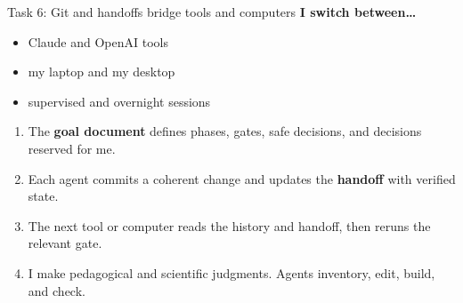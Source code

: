 \begin{frame}{Task 6: Git and handoffs bridge tools and computers}
  \vfill
  \textbf{I switch between\ldots}
  \begin{itemize}\setlength\itemsep{0.35em}
    \item Claude and OpenAI tools
    \item my laptop and my desktop
    \item supervised and overnight sessions
  \end{itemize}
  \vspace{0.9em}
  \begin{enumerate}\setlength\itemsep{0.38em}
    \item The \textbf{goal document} defines phases, gates, safe decisions, and decisions reserved for me.
    \item Each agent commits a coherent change and updates the \textbf{handoff} with verified state.
    \item The next tool or computer reads the history and handoff, then reruns the relevant gate.
    \item I make pedagogical and scientific judgments. Agents inventory, edit, build, and check.
  \end{enumerate}
  \vfill
  \begin{center}
  \end{center}
  \vspace{0.55cm plus 1fill}
\end{frame}
